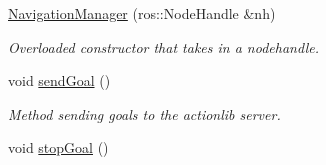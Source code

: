 \begin{DoxyCompactItemize}
\item 
\hyperlink{classlfe__navigation_1_1NavigationManager_a04357660f9d9c640eb3aefc382def800}{Navigation\+Manager} (ros\+::\+Node\+Handle \&nh)
\begin{DoxyCompactList}\small\item\em Overloaded constructor that takes in a nodehandle. \end{DoxyCompactList}\item 
void \hyperlink{classlfe__navigation_1_1NavigationManager_a708b61e1da4997d9e52dba82ce8abdb9}{send\+Goal} ()\hypertarget{classlfe__navigation_1_1NavigationManager_a708b61e1da4997d9e52dba82ce8abdb9}{}\label{classlfe__navigation_1_1NavigationManager_a708b61e1da4997d9e52dba82ce8abdb9}

\begin{DoxyCompactList}\small\item\em Method sending goals to the actionlib server. \end{DoxyCompactList}\item 
void \hyperlink{classlfe__navigation_1_1NavigationManager_a8a263bf41e271138c7827c4dd5ab85fa}{stop\+Goal} ()\hypertarget{classlfe__navigation_1_1NavigationManager_a8a263bf41e271138c7827c4dd5ab85fa}{}\label{classlfe__navigation_1_1NavigationManager_a8a263bf41e271138c7827c4dd5ab85fa}


\end{DoxyCompactItemize}
